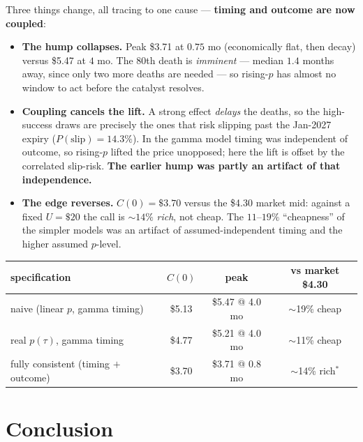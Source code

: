 \documentclass[11pt]{article}
\begin{document}
\noindent Three things change, all tracing to one cause --- \textbf{timing and outcome are now
coupled}:
\begin{itemize}[leftmargin=1.4em,itemsep=2pt]
  \item \textbf{The hump collapses.} Peak \$3.71 at $0.75$ mo (economically flat, then decay)
        versus \$5.47 at $4$ mo. The 80th death is \emph{imminent} --- median $1.4$ months away,
        since only two more deaths are needed --- so rising-$p$ has almost no window to act before
        the catalyst resolves.
  \item \textbf{Coupling cancels the lift.} A strong effect \emph{delays} the deaths, so the
        high-success draws are precisely the ones that risk slipping past the Jan-2027 expiry
        ($P(\text{slip})=14.3\%$). In the gamma model timing was independent of outcome, so
        rising-$p$ lifted the price unopposed; here the lift is offset by the correlated slip-risk.
        \textbf{The earlier hump was partly an artifact of that independence.}
  \item \textbf{The edge reverses.} $C(0)=\$3.70$ versus the \$4.30 market mid: against a fixed
        $U=\$20$ the call is $\sim\!14\%$ \emph{rich}, not cheap. The $11\text{--}19\%$
        ``cheapness'' of the simpler models was an artifact of assumed-independent timing and the
        higher assumed $p$-level.
\end{itemize}

\begin{center}
\begin{tabular}{lccc}
\toprule
specification & $C(0)$ & peak & vs market \$4.30 \\
\midrule
naive (linear $p$, gamma timing) & \$5.13 & \$5.47 @ 4.0 mo & $\sim$19\% cheap \\
real $p(\tau)$, gamma timing & \$4.77 & \$5.21 @ 4.0 mo & $\sim$11\% cheap \\
fully consistent (timing $+$ outcome) & \$3.70 & \$3.71 @ 0.8 mo & $\sim$14\% rich$^*$ \\
\bottomrule
\end{tabular}
\end{center}

\section*{Conclusion}
\end{document}
